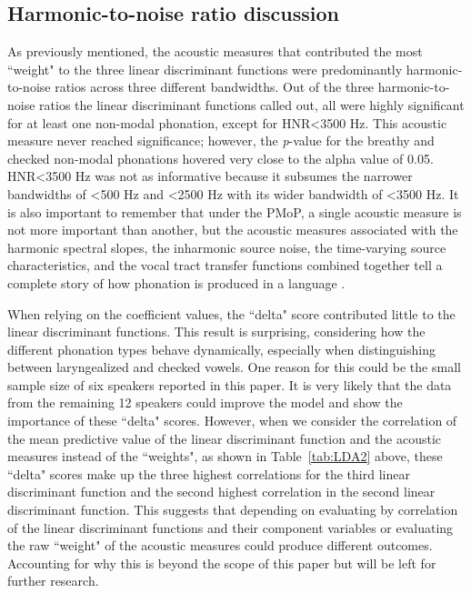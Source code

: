 \documentclass[12pt, letterpaper]{article}
\begin{document}
\subsection{Harmonic-to-noise ratio discussion} \label{sec:DiscussionHNR}

As previously mentioned, the acoustic measures that contributed the most ``weight" to the three linear discriminant functions were predominantly harmonic-to-noise ratios across three different bandwidths. Out of the three harmonic-to-noise ratios the linear discriminant functions called out, all were highly significant for at least one non-modal phonation, except for HNR\textless 3500 Hz. This acoustic measure never reached significance; however, the \textit{p}-value for the breathy and checked non-modal phonations hovered very close to the alpha value of 0.05. HNR\textless 3500 Hz was not as informative because it subsumes the narrower bandwidths of \textless 500 Hz and \textless 2500 Hz with its wider bandwidth of \textless 3500 Hz. It is also important to remember that under the PMoP, a single acoustic measure is not more important than another, but the acoustic measures associated with the harmonic spectral slopes, the inharmonic source noise, the time-varying source characteristics, and the vocal tract transfer functions combined together tell a complete story of how phonation is produced in a language \citep{kreimanUnifiedTheoryVoice2014, garellekPhoneticsVoice2019,kreimanValidatingPsychoacousticModel2021}. 

When relying on the coefficient values, the ``delta" score contributed little to the linear discriminant functions. This result is surprising, considering how the different phonation types behave dynamically, especially when distinguishing between laryngealized and checked vowels. One reason for this could be the small sample size of six speakers reported in this paper. It is very likely that the data from the remaining 12 speakers could improve the model and show the importance of these ``delta" scores. However, when we consider the correlation of the mean predictive value of the linear discriminant function and the acoustic measures instead of the ``weights", as shown in Table~\ref{tab:LDA2} above, these ``delta" scores make up the three highest correlations for the third linear discriminant function and the second highest correlation in the second linear discriminant function. This suggests that depending on evaluating by correlation of the linear discriminant functions and their component variables or evaluating the raw ``weight" of the acoustic measures could produce different outcomes. Accounting for why this is beyond the scope of this paper but will be left for further research. 
\end{document}
